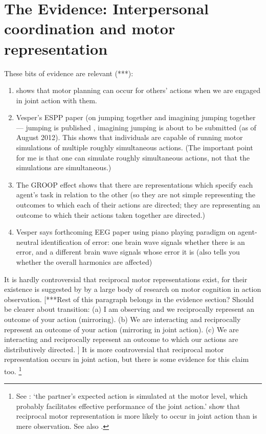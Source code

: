 \documentclass[12pt,\papersize]{extarticle}
\begin{document}
\section{The Evidence: Interpersonal coordination and motor representation}

These bits of evidence are relevant (***):
%
\begin{enumerate}

\item \citet{kourtis:2012_predictive} shows that motor planning can occur for others' actions when we are engaged in joint action with them.

\item Vesper's ESPP paper (on jumping together and imagining jumping together --- jumping is published \citep{vesper:2012_jumping}, imagining jumping is about to be submitted (as of August 2012).  This shows that individuals are capable of running motor simulations of multiple roughly simultaneous actions. 
(The important point for me is that one can simulate roughly simultaneous actions, not that the simulations are simultaneous.)

\item The GROOP effect shows that there are representations which specify each agent's task in relation to the other (so they are not simple representing the outcomes to which each of their actions are directed; they are representing an outcome to which their actions taken together are directed.)

\item Vesper says forthcoming EEG paper using piano playing paradigm on agent-neutral identification of error: one brain wave signals whether there is an error, and a different brain wave signals whose error it is (also tells you whether the overall harmonics are affected)
\end{enumerate}


It is hardly controversial that reciprocal motor representations exist, for their existence is suggested by by a large body of research on motor cognition in action observation.
[***Rest of this paragraph belongs in the evidence section?
Should be clearer about transition:
(a) I am observing and we reciprocally represent an outcome of your action (mirroring).
(b) We are interacting and reciprocally represent an outcome of your action (mirroring in joint action).
(c) We are interacting and reciprocally represent an outcome to which our actions are distributively directed.%
] 
It is more controversial that reciprocal motor representation occurs in joint action, but there is some evidence for this claim too.%
\footnote{
See \citet{kourtis:2012_predictive}: `the partner’s expected action is simulated at the motor level, which probably facilitates effective performance of the joint action.'
\citet{kourtis:2010_favoritism} show that 
reciprocal motor representation is more likely to occur in joint action than is mere observation. 
See also \citet{Knoblich:2003nf}.
 }
\end{document}
